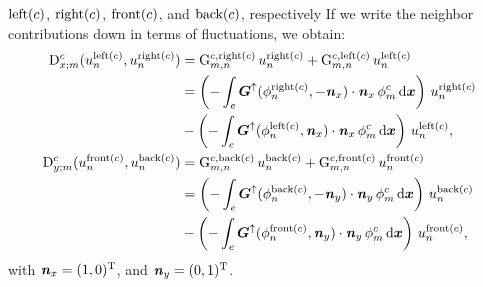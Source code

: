 \documentclass{scrreprt}
\begin{document}
$\textup{left}(c)$, $\textup{right}(c)$, $\textup{front}(c)$,
and $\textup{back}(c)$, respectively
If we write the neighbor contributions
down in terms of fluctuations, we obtain:
\begin{align}
\mathrm{D}^c_{x;m} (u_{n}^{\textup{left}(c)},u_{n}^{\textup{right}(c)}) &=
\mathrm{G}_{m,n}^{c,\textup{right}(c)}\,u_{n}^{\textup{right}(c)} +
\mathrm{G}_{m,n}^{c,\textup{left}(c)}\,u_{n}^{\textup{left}(c)} \\
&=
\left(-\int_{e}
{\boldsymbol G}^{\uparrow}(\phi^{\textup{right}(c)}_{n},-{\boldsymbol {\mathit{n}}}_x)
\cdot{\boldsymbol {\mathit{n}}}_x\,
\phi^{c}_{m} \, \text{d}{\boldsymbol x}\right)
\,u_{n}^{\textup{right}(c)} 
\\
&-
\left(-\int_{e}
{\boldsymbol G}^{\uparrow}(\phi^{\textup{left}(c)}_{n},{\boldsymbol {\mathit{n}}}_x)
\cdot{\boldsymbol {\mathit{n}}}_x\,
\phi^{c}_{m} \, \text{d}{\boldsymbol x}\right)
\,u_{n}^{\textup{left}(c)},
\\
\mathrm{D}^c_{y;m} (u_{n}^{\textup{front}(c)},u_{n}^{\textup{back}(c)}) &= 
\mathrm{G}_{m,n}^{c,\textup{back}(c)}\,u_{n}^{\textup{back}(c)}
+ \mathrm{G}_{m,n}^{c,\textup{front}(c)}\,u_{n}^{\textup{front}(c)} \\
&=
\left(-\int_{e}
{\boldsymbol G}^{\uparrow}(\phi^{\textup{back}(c)}_{n},-{\boldsymbol {\mathit{n}}}_y)
\cdot{\boldsymbol {\mathit{n}}}_y\,
\phi^{c}_{m} \, \text{d}{\boldsymbol x}\right)
\,u_{n}^{\textup{back}(c)} 
\\
&-
\left(-\int_{e}
{\boldsymbol G}^{\uparrow}(\phi^{\textup{front}(c)}_{n},{\boldsymbol {\mathit{n}}}_y)
\cdot{\boldsymbol {\mathit{n}}}_y\,
\phi^{c}_{m} \, \text{d}{\boldsymbol x}\right)
\,u_{n}^{\textup{front}(c)},
\end{align}
with ${\boldsymbol {\mathit{n}}}_x=(1,0)^\textup{T}$, and ${\boldsymbol {\mathit{n}}}_y=(0,1)^\textup{T}$.
\end{document}
